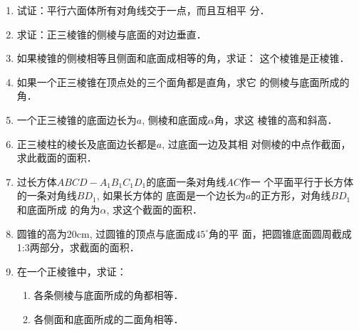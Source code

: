 \begin{enumerate}
    \item 试证：平行六面体所有对角线交于一点，而且互相平
分．
\item 求证：正三棱锥的侧棱与底面的对边垂直．
\item 如果棱锥的侧棱相等且侧面和底面成相等的角，求证：
这个棱锥是正棱锥．
\item 如果一个正三棱锥在顶点处的三个面角都是直角，求它
的侧棱与底面所成的角．
\item 一个正三棱锥的底面边长为$a$, 侧棱和底面成$\alpha$角，求这
棱锥的高和斜高．
\item 正三棱柱的棱长及底面边长都是$a$, 过底面一边及其相
对侧棱的中点作截面，求此截面的面积．
\item 过长方体$ABCD-A_1B_1C_1D_1$的底面一条对角线$AC$作一
个平面平行于长方体的一条对角线$BD_1$, 如果长方体的
底面是一个边长为$a$的正方形，对角线$BD_1$和底面所成
的角为$\alpha$, 求这个截面的面积．
\item 圆锥的高为20cm, 过圆锥的顶点与底面成$45^{\circ}$角的平
面，把圆锥底面圆周截成1:3两部分，求截面的面积．
\item 在一个正棱锥中，求证：
\begin{enumerate}
    \item 各条侧棱与底面所成的角都相等．
    \item 各侧面和底面所成的二面角相等．
\end{enumerate}


\end{enumerate}
